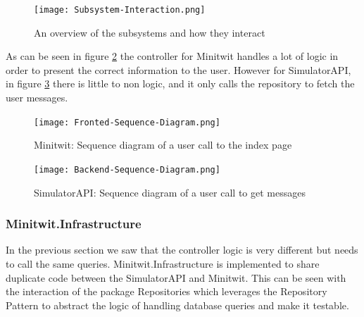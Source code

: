 \begin{figure}[H]
    \begin{center}
        \texttt{[image: Subsystem-Interaction.png]}
    \end{center}
    \caption{An overview of the subsystems and how they interact}
    \label{fig:subsystem-interaction}
\end{figure}

As can be seen in figure \ref{fig:frontend-interaction} the controller for Minitwit handles a lot of logic in order to present the correct information to the user. However for SimulatorAPI, in figure \ref{fig:backend-interaction} there is little to non logic, and it only calls the repository to fetch the user messages.
\begin{figure}[H]
    \begin{center}
        \texttt{[image: Fronted-Sequence-Diagram.png]}
    \end{center}
    \caption{Minitwit: Sequence diagram of a user call to the index page}
    \label{fig:frontend-interaction}
\end{figure}
\begin{figure}[H]
    \begin{center}
        \texttt{[image: Backend-Sequence-Diagram.png]}
    \end{center}
    \caption{SimulatorAPI: Sequence diagram of a user call to get messages}
    \label{fig:backend-interaction}
\end{figure}
\subsubsection{Minitwit.Infrastructure}
In the previous section we saw that the controller logic is very different but needs to call the same queries.
Minitwit.Infrastructure is implemented to share duplicate code between the SimulatorAPI and Minitwit. This can be seen with the interaction of the package Repositories which leverages the Repository Pattern to abstract the logic of handling database queries and make it testable.



